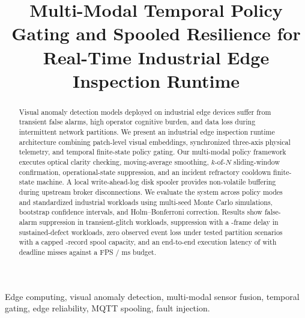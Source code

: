 \documentclass[conference]{IEEEtran}
\begin{document}
\title{Multi-Modal Temporal Policy Gating and Spooled Resilience for Real-Time Industrial Edge Inspection Runtime}

\author{
}

\maketitle

\begin{abstract}
Visual anomaly detection models deployed on industrial edge devices suffer from transient false alarms, high operator cognitive burden, and data loss during intermittent network partitions. We present an industrial edge inspection runtime architecture combining patch-level visual embeddings, synchronized three-axis physical telemetry, and temporal finite-state policy gating. Our multi-modal policy framework executes optical clarity checking, moving-average smoothing, $k$-of-$N$ sliding-window confirmation, operational-state suppression, and an incident refractory cooldown finite-state machine. A local write-ahead-log disk spooler provides non-volatile buffering during upstream broker disconnections. We evaluate the system across \TotalPolicyModes{} policy modes and \TotalWorkloadScenarios{} standardized industrial workloads using multi-seed Monte Carlo simulations, bootstrap confidence intervals, and Holm--Bonferroni correction. Results show \GlitchSuppressionFull{} false-alarm suppression in transient-glitch workloads, \SustainedSuppressionFull{} suppression with a \SustainedMedianDelay{}-frame delay in sustained-defect workloads, zero observed event loss under tested partition scenarios with a capped \SpoolBufferCapacity{}-record spool capacity, and an end-to-end execution latency of \MeanPipelineLatency{} with \DeadlineMissRate{} deadline misses against a \TargetFPS{} FPS / \TargetDeadlineMs{} ms budget.
\end{abstract}

\begin{IEEEkeywords}
Edge computing, visual anomaly detection, multi-modal sensor fusion, temporal gating, edge reliability, MQTT spooling, fault injection.
\end{IEEEkeywords}
\end{document}
